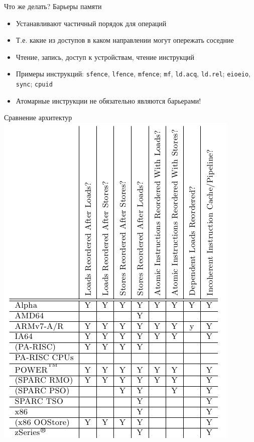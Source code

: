 \documentclass{beamer}
\begin{document}
\begin{frame}{Что же делать? Барьеры памяти}
\begin{itemize}
    \item Устанавливают частичный порядок для операций
    \item Т.е. какие из доступов в каком направлении могут опережать соседние
    \item Чтение, запись, доступ к устройствам, чтение инструкций
    \item Примеры инструкций: \texttt{sfence}, \texttt{lfence}, \texttt{mfence}; \texttt{mf}, \texttt{ld.acq}, \texttt{ld.rel}; \texttt{eioeio}, \texttt{sync}; \texttt{cpuid}
	\item Атомарные инструкции не обязательно являются барьерами!
\end{itemize}
\end{frame}

\begin{frame}{Сравнение архитектур}
\centering\includegraphics[height=0.8\textheight]{barrier-arch.png}

\end{frame}
\end{document}
